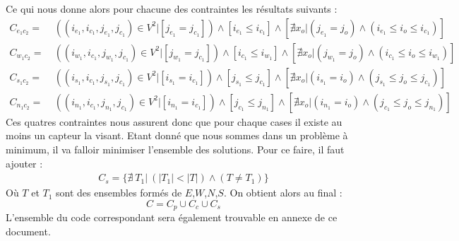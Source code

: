 \documentclass[a4paper]{article}
\begin{document}
Ce qui nous donne alors pour chacune des contraintes les résultats suivants : 
\begin{align*}
C_{e_1c_2} = & \ ( (i_{e_1},i_{c_1},j_{e_1},j_{c_1}) \in V^2 | [ j_{e_1} = j_{c_1} ] ) \wedge [i_{e_1} \leq i_{c_1}] \wedge [\nexists x_o | (j_{e_1} = j_o) \wedge (i_{e_1} \leq i_{o} \leq i_{c_1})] \\
C_{w_1c_2} = & \ ( (i_{w_1},i_{c_1},j_{w_1},j_{c_1}) \in V^2 | [ j_{w_1} = j_{c_1} ] ) \wedge [i_{c_1} \leq i_{w_1}] \wedge [\nexists x_o | (j_{w_1} = j_o) \wedge (i_{c_1} \leq i_{o} \leq i_{w_1})] \\
C_{s_1c_2} = & \ ( (i_{s_1},i_{c_1},j_{s_1},j_{c_1}) \in V^2 | [ i_{s_1} = i_{c_1} ] ) \wedge [j_{s_1} \leq j_{c_1}] \wedge [\nexists x_o | (i_{s_1} = i_o) \wedge (j_{s_1} \leq j_{o} \leq j_{c_1})] \\
C_{n_1c_2} = & \ ( (i_{n_1},i_{c_1},j_{n_1},j_{c_1}) \in V^2 | [ i_{n_1} = i_{c_1} ] ) \wedge [j_{c_1} \leq j_{n_1}] \wedge [\nexists x_o | (i_{n_1} = i_o) \wedge (j_{c_1} \leq j_{o} \leq j_{n_1})] 
\end{align*}
Ces quatres contraintes nous assurent donc que pour chaque cases il existe au moins un capteur la visant. Etant donné que nous sommes dans un problème à minimum, il va falloir minimiser l'ensemble des solutions. Pour ce faire, il faut ajouter : 
\begin{align*}
C_s = \{ \nexists \ T_1 | \ (| T_1 | <  | T | ) \wedge (T \neq T_1) \}
\end{align*}
Où $T$ et $T_1$ sont des ensembles formés de $E$,$W$,$N$,$S$. On obtient alors au final : 
\begin{equation*}
C = C_p \cup C_c \cup C_s
\end{equation*}
L'ensemble du code correspondant sera également trouvable en annexe de ce document.
\end{document}
